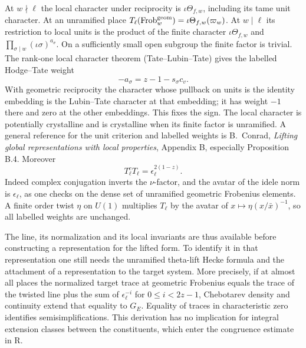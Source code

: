 At $w\nmid\ell$ the local character under reciprocity is $\iota\Theta_{f,w}$, including its tame unit character. At an unramified place $T_\ell(\operatorname{Frob}^{\rm geom}_w)=\iota\Theta_{f,w}(\varpi_w)$. At $w\mid\ell$ its restriction to local units is the product of the finite character $\iota\Theta_{f,w}$ and $\prod_{\sigma\mid w}(\iota\sigma)^{a_\sigma}$. On a sufficiently small open subgroup the finite factor is trivial. The rank-one local character theorem (Tate--Lubin--Tate) gives the labelled Hodge--Tate weight
\[
   -a_\sigma=z-1-s_\sigma c_v .
\]
With geometric reciprocity the character whose pullback on units is the identity embedding is the Lubin--Tate character at that embedding; it has weight $-1$ there and zero at the other embeddings. This fixes the sign. The local character is potentially crystalline and is crystalline when its finite factor is unramified. A general reference for the unit criterion and labelled weights is B.~Conrad, \emph{Lifting global representations with local properties}, Appendix B, especially Proposition B.4. Moreover
\[
 T_\ell^c T_\ell=\epsilon_\ell^{2(1-z)}.
\]
Indeed complex conjugation inverts the $\nu$-factor, and the avatar of the idele norm is $\epsilon_\ell$, as one checks on the dense set of unramified geometric Frobenius elements. A finite order twist $\eta$ on $U(1)$ multiplies $T_\ell$ by the avatar of $x\mapsto\eta(x/\bar x)^{-1}$, so all labelled weights are unchanged.

The line, its normalization and its local invariants are thus available before constructing a representation for the lifted form. To identify it in that representation one still needs the unramified theta-lift Hecke formula and the attachment of a representation to the target system. More precisely, if at almost all places the normalized target trace at geometric Frobenius equals the trace of the twisted line plus the sum of $\epsilon_\ell^{-i}$ for $0\le i<2z-1$, Chebotarev density and continuity extend that equality to $G_E$. Equality of traces in characteristic zero identifies semisimplifications. This derivation has no implication for integral extension classes between the constituents, which enter the congruence estimate in R.
